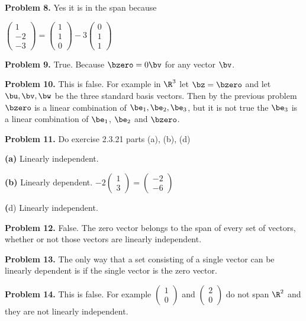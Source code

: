 \documentclass[oneside,12pt]{amsart}
\begin{document}
\textbf{Problem 8.}
Yes it is in the span because

\bigskip

$
\begin{pmatrix}
1 \\ -2 \\ -3
\end{pmatrix}
=
\begin{pmatrix}
1 \\ 1 \\ 0
\end{pmatrix}
-
3
\begin{pmatrix}
0 \\ 1 \\ 1
\end{pmatrix}
$

\bigskip


\textbf{Problem 9.} True. Because $\bzero = 0 \bv$ for
any vector $\bv$.

\bigskip

\textbf{Problem 10.} This is false. For example in $\R^3$
let $\bz = \bzero$ and let $\bu,\bv,\bw$ be the three
standard basis vectors. Then by the previous problem
$\bzero$ is a linear combination of $\be_1,\be_2,\be_3$, but it is not true the $\be_3$ is a linear combination of $\be_1$, $\be_2$ and $\bzero$.


\bigskip


\textbf{Problem 11.} Do exercise 2.3.21 parts (a), (b), (d)

\textbf{(a)} Linearly independent.

\bigskip

\textbf{(b)} Linearly dependent.
$
-2
\begin{pmatrix}
1 \\ 3
\end{pmatrix}
=
\begin{pmatrix}
-2 \\ -6
\end{pmatrix}
$
\bigskip

\textbf(d) Linearly independent.


\bigskip


\textbf{Problem 12.} False. The zero vector belongs to the span of every
set of vectors, whether or not those vectors are linearly independent.

\bigskip

\textbf{Problem 13.} The only way that a set consisting of a single vector
can be linearly dependent is if the single vector is the zero vector.

\bigskip

\textbf{Problem 14.} This is false. For example
$
\begin{pmatrix}
1 \\ 0
\end{pmatrix}
$
and
$
\begin{pmatrix}
2 \\ 0
\end{pmatrix}
$
do not span $\R^2$ and they are not linearly independent.
\end{document}
